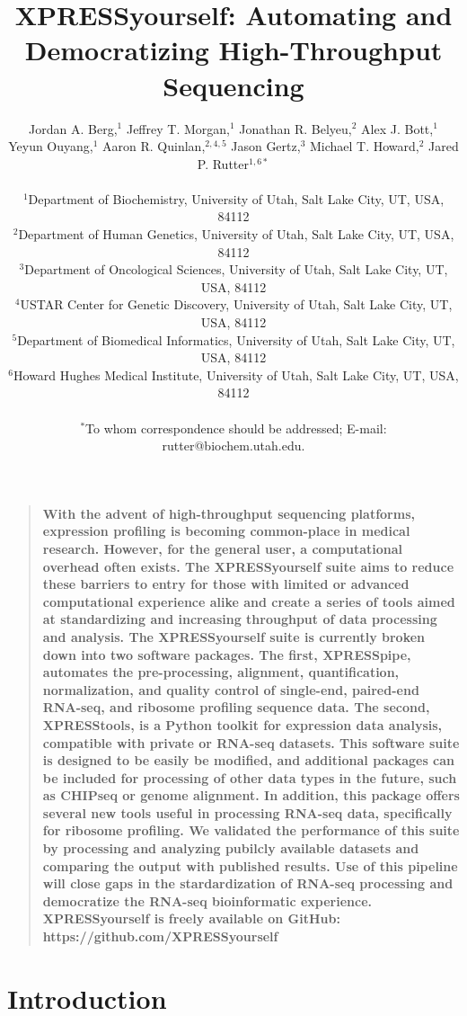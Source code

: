 \documentclass[11pt, a4paper, oneside]{article}
\title{
XPRESSyourself: Automating and Democratizing High-Throughput Sequencing
}
\author{
Jordan A. Berg,$^{1}$ Jeffrey T. Morgan,$^{1}$ Jonathan R. Belyeu,$^{2}$ Alex J. Bott,$^{1}$ \\
Yeyun Ouyang,$^{1}$ Aaron R. Quinlan,$^{2,4,5}$ Jason Gertz,$^{3}$ Michael T. Howard,$^{2}$ Jared P. Rutter$^{1,6\ast}$\\
\\
\normalsize{$^{1}$Department of Biochemistry, University of Utah, Salt Lake City, UT, USA, 84112}\\
\normalsize{$^{2}$Department of Human Genetics, University of Utah, Salt Lake City, UT, USA, 84112}\\
\normalsize{$^{3}$Department of Oncological Sciences, University of Utah, Salt Lake City, UT, USA, 84112}\\
\normalsize{$^{4}$USTAR Center for Genetic Discovery, University of Utah, Salt Lake City, UT, USA, 84112}\\
\normalsize{$^{5}$Department of Biomedical Informatics, University of Utah, Salt Lake City, UT, USA, 84112}\\
\normalsize{$^{6}$Howard Hughes Medical Institute, University of Utah, Salt Lake City, UT, USA, 84112}\\
\\
\normalsize{$^\ast$To whom correspondence should be addressed; E-mail: rutter@biochem.utah.edu.}
}
\date{}
\newenvironment{sciabstract}{%
\begin{quote} \bf}
{\end{quote}}
\begin{document}
\baselineskip24pt

\maketitle



\begin{sciabstract}
With the advent of high-throughput sequencing platforms, expression profiling is becoming common-place in medical research. However, for the general user, a computational overhead often exists. The XPRESSyourself suite aims to reduce these barriers to entry for those with limited or advanced computational experience alike and create a series of tools aimed at standardizing and increasing throughput of data processing and analysis. The XPRESSyourself suite is currently broken down into two software packages. The first, XPRESSpipe, automates the pre-processing, alignment, quantification, normalization, and quality control of single-end, paired-end RNA-seq, and ribosome profiling sequence data. The second, XPRESStools, is a Python toolkit for expression data analysis, compatible with private or RNA-seq datasets. This software suite is designed to be easily be modified, and additional packages can be included for processing of other data types in the future, such as CHIPseq or genome alignment. In addition, this package offers several new tools useful in processing RNA-seq data, specifically for ribosome profiling. We validated the performance of this suite by processing and analyzing pubilcly available datasets and comparing the output with published results. Use of this pipeline will close gaps in the stardardization of RNA-seq processing and democratize the RNA-seq bioinformatic experience.
\newline\\
\normalfont XPRESSyourself is freely available on GitHub: https://github.com/XPRESSyourself\\
\end{sciabstract}


\section{Introduction}
\end{document}
